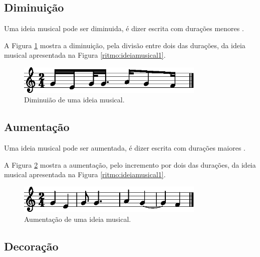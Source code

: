 \subsection{Diminuição}

Uma ideia musical pode ser diminuida, é dizer escrita com durações menores
\cite[pp. 30]{bennett1993elementos}.

A Figura \ref{ritmo:diminuicao-ex1} mostra a diminuição, pela divisão entre dois das durações, 
da ideia musical apresentada na Figura \ref{ritmo:ideiamusical1}.
\begin{figure}[H]
\centering
    \includegraphics[width=0.8\textwidth]{chapters/cap-musica-composer/diminuicao-ex1-1.eps}
\caption{Diminuião de uma ideia musical.}
\label{ritmo:diminuicao-ex1}
\end{figure}

\subsection{Aumentação}

Uma ideia musical pode ser aumentada, é dizer escrita com durações maiores
\cite[pp. 30]{bennett1993elementos}.

A Figura \ref{ritmo:aumentacao-ex1} mostra a aumentação, pelo incremento por dois das durações, 
da ideia musical apresentada na Figura \ref{ritmo:ideiamusical1}.
\begin{figure}[H]
\centering
    \includegraphics[width=0.8\textwidth]{chapters/cap-musica-composer/aumentacao-ex1-1.eps}
\caption{Aumentação de uma ideia musical.}
\label{ritmo:aumentacao-ex1}
\end{figure}

\subsection{Decoração}

